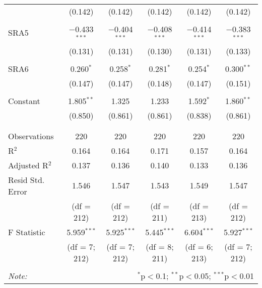 \begin{table}[H]
\begin{adjustbox}{width=\textwidth}
\begin{tabular}{@{\extracolsep{5pt}}lccccc}
  & (0.142) & (0.142) & (0.142) & (0.142) & (0.142) \\ 
  & & & & & \\ 
 SRA5 & $-$0.433$^{***}$ & $-$0.404$^{***}$ & $-$0.408$^{***}$ & $-$0.414$^{***}$ & $-$0.383$^{***}$ \\ 
  & (0.131) & (0.131) & (0.130) & (0.131) & (0.133) \\ 
  & & & & & \\ 
 SRA6 & 0.260$^{*}$ & 0.258$^{*}$ & 0.281$^{*}$ & 0.254$^{*}$ & 0.300$^{**}$ \\ 
  & (0.147) & (0.147) & (0.148) & (0.147) & (0.151) \\ 
  & & & & & \\ 
 Constant & 1.805$^{**}$ & 1.325 & 1.233 & 1.592$^{*}$ & 1.860$^{**}$ \\ 
  & (0.850) & (0.861) & (0.861) & (0.838) & (0.861) \\ 
  & & & & & \\ 
\hline \\[-1.8ex] 
Observations & 220 & 220 & 220 & 220 & 220 \\ 
R$^{2}$ & 0.164 & 0.164 & 0.171 & 0.157 & 0.164 \\ 
Adjusted R$^{2}$ & 0.137 & 0.136 & 0.140 & 0.133 & 0.136 \\ 
Resid Std. Error & 1.546 & 1.547  & 1.543  & 1.549 & 1.547  \\ 
& (df = 212) &(df = 212) &(df = 211) &(df = 213) &(df = 212) \\
F Statistic & 5.959$^{***}$ & 5.925$^{***}$ & 5.445$^{***}$  & 6.604$^{***}$  & 5.927$^{***}$  \\ 
& (df = 7; 212) & (df = 7; 212) & (df = 8; 211) & (df = 6; 213) & (df = 7; 212) \\
\hline 
\hline \\[-1.8ex] 
\textit{Note:}  & \multicolumn{5}{r}{$^{*}$p$<$0.1; $^{**}$p$<$0.05; $^{***}$p$<$0.01} \\ 
\end{tabular} 
\end{adjustbox}
\end{table} 

